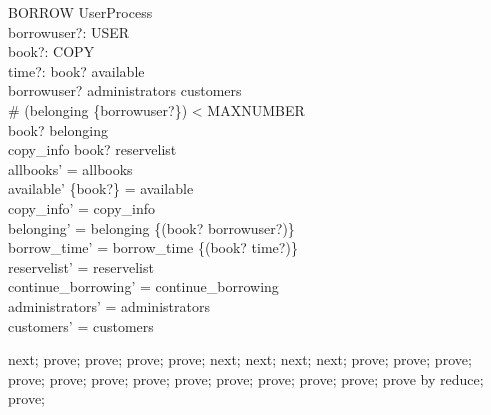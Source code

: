\begin{schema}{BORROW}
  UserProcess\\
  borrowuser?: USER\\
  book?: COPY\\
  time?: \nat 
\where
  book? \in  available\\
  borrowuser? \in  administrators \cup  customers\\
  \# (belonging \rres  \{borrowuser?\}) < MAXNUMBER\\
  book? \notin  \dom  belonging\\
  copy\_info book? \notin  \dom  reservelist\\
  allbooks' = allbooks\\
  available' \cup  \{book?\} = available\\
  copy\_info' = copy\_info\\
  belonging' = belonging \cup  \{(book? \mapsto  borrowuser?)\}\\
  borrow\_time' = borrow\_time \cup  \{(book? \mapsto  time?)\}\\
  reservelist' = reservelist\\
  continue\_borrowing' = continue\_borrowing\\
  administrators' = administrators\\
  customers' = customers
\end{schema}

\begin{zproof}
next;
prove;
prove;
prove;
prove;
next;
next;
next;
next;
prove;
prove;
prove;
prove;
prove;
prove;
prove;
prove;
prove;
prove;
prove;
prove;
prove by reduce;
prove;
\end{zproof}

